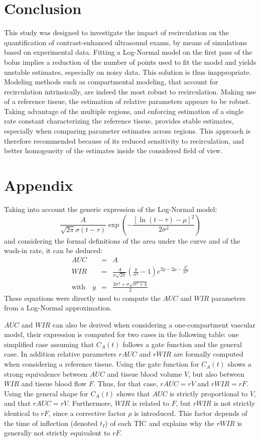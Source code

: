 \section{Conclusion}
This study was designed to investigate the impact of recirculation on the quantification of contrast-enhanced ultrasound exams, by means of simulations based on experimental data. 
Fitting a Log-Normal model on the first pass of the bolus implies a reduction of the number of points used to fit the model and yields unstable estimates, especially on noisy data. This solution is thus inappropriate. Modeling methods such as compartmental modeling, that account for recirculation intrinsically, are indeed the most robust to recirculation. Making use of a reference tissue, the estimation of relative parameters appears to be robust. Taking advantage of the multiple regions, and enforcing estimation of a single rate constant characterizing the reference tissue, provides stable estimates, especially when comparing parameter estimates across regions. This approach is therefore recommended because of its reduced sensitivity to recirculation, and better homogeneity of the estimates inside the considered field of view. 

\section*{Appendix}
Taking into account the generic expression of the Log-Normal model:
\begin{equation*}
\frac{A}{\sqrt{2 \pi}\sigma (t- \tau)} \exp \left( - \frac{\left[ \ln{(t- \tau)} - \mu \right]^2}{2{\sigma}^2} \right)
\end{equation*}
and considering the formal definitions of the area under the curve and of the wash-in rate, it can be deduced:
\begin{eqnarray*}
AUC &= & A \\
WIR &= &\frac{A}{\sigma\sqrt{2\pi}}\left(\frac{y}{\sigma^2}-1\right)e^{2y-2\mu-\frac{y^2}{2\sigma^2}} \\
\text{with} \quad y &= &\frac{3\sigma^2+\sigma\sqrt{\sigma^2+4}}{2}
\end{eqnarray*}
These equations were directly used to compute the $AUC$ and $WIR$ parameters from a Log-Normal approximation.

$AUC$ and $WIR$ can also be derived when considering a one-compartment vascular model, their expression is computed for two cases in the following table: one simplified case assuming that $C_A(t)$ follows a gate function and the general case. In addition relative parameters $rAUC$ and $rWIR$ are formally computed when considering a reference tissue. 
Using the gate function for $C_A(t)$ shows a strong equivalence between $AUC$ and tissue blood volume $V$, but also between $WIR$ and tissue blood flow $F$. Thus, for that case, $rAUC = rV$ and $rWIR = rF$. 
Using the general shape for $C_A(t)$ shows that $AUC$ is strictly proportional to $V$, and that $rAUC = rV$. Furthermore, $WIR$ is related to $F$, but $rWIR$ is not strictly identical to $rF$, since a corrective factor $\rho$ is introduced. This factor depends of the time of inflection (denoted $t_I$) of each TIC and explains why the $rWIR$ is generally not strictly equivalent to $rF$.

